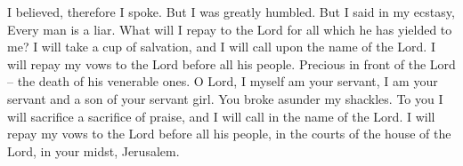 I believed, therefore I spoke. But I was greatly humbled. But I said in my ecstasy, Every man is a liar. What will I repay to the Lord for all which he has yielded to me? I will take a cup of salvation, and I will call upon the name of the Lord. I will repay my vows to the Lord before all his people. Precious in front of the Lord -- the death of his venerable ones. O Lord, I myself am your servant, I am your servant and a son of your servant girl. You broke asunder my shackles. To you I will sacrifice a sacrifice of praise, and I will call in the name of the Lord. I will repay my vows to the Lord before all his people, in the courts of the house of the Lord, in your midst, Jerusalem.